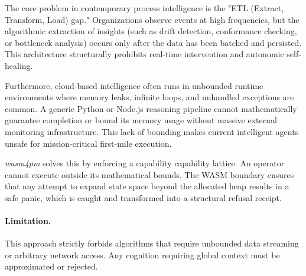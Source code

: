 The core problem in contemporary process intelligence is the "ETL (Extract, Transform, Load) gap." Organizations observe events at high frequencies, but the algorithmic extraction of insights (such as drift detection, conformance checking, or bottleneck analysis) occurs only after the data has been batched and persisted. This architecture structurally prohibits real-time intervention and autonomic self-healing.

Furthermore, cloud-based intelligence often runs in unbounded runtime environments where memory leaks, infinite loops, and unhandled exceptions are common. A generic Python or Node.js reasoning pipeline cannot mathematically guarantee completion or bound its memory usage without massive external monitoring infrastructure. This lack of bounding makes current intelligent agents unsafe for mission-critical first-mile execution.

\textit{wasm4pm} solves this by enforcing a capability capability lattice. An operator cannot execute outside its mathematical bounds. The WASM boundary ensures that any attempt to expand state space beyond the allocated heap results in a safe panic, which is caught and transformed into a structural refusal receipt.

\paragraph{Limitation.} This approach strictly forbids algorithms that require unbounded data streaming or arbitrary network access. Any cognition requiring global context must be approximated or rejected.
